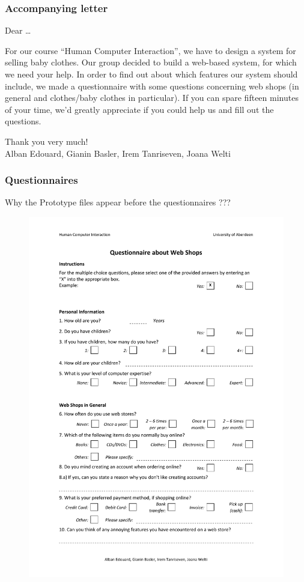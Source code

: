 \subsubsection{Accompanying letter}\label{sec:letter}
Dear \dots

For our course ``Human Computer Interaction'', we have to design a system for selling baby clothes. Our group decided to build a web-based system, for which we need your help. In order to find out about which features our system should include, we made a questionnaire with some questions concerning web shops (in general and clothes/baby clothes in particular).
If you can spare fifteen minutes of your time, we'd greatly appreciate if you could help us and fill out the questions.

Thank you very much!\\
Alban Edouard, Gianin Basler, Irem Tanriseven, Joana Welti


\subsubsection{Questionnaires}

Why the Prototype files appear before the questionnaires ???

\begin{figure}[h!]
\centering
\includegraphics[width=1.0\textwidth]{User_Involvement_Methods/Questionnaires/Questionnaire_Web_Shops_v2.pdf}
\end{figure}

